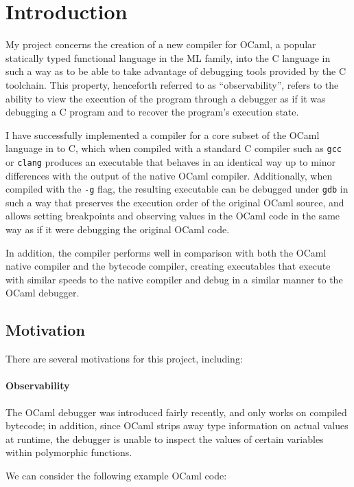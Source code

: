\chapter{Introduction}

My project concerns the creation of a new compiler for OCaml, a popular
statically typed functional language in the ML family, into the C language in
such a way as to be able to take advantage of debugging tools provided by the C
toolchain. This property, henceforth referred to as ``observability'', refers to
the ability to view the execution of the program through a debugger as if it was
debugging a C program and to recover the program's execution state.

I have successfully implemented a compiler for a core subset of the OCaml
language in to C, which when compiled with a standard C compiler such as
\texttt{gcc} or \texttt{clang} produces an executable that behaves in an
identical way up to minor differences with the output of the native OCaml
compiler. Additionally, when compiled with the \texttt{-g} flag, the resulting
executable can be debugged under \texttt{gdb} in such a way that preserves the
execution order of the original OCaml source, and allows setting breakpoints and
observing values in the OCaml code in the same way as if it were debugging the
original OCaml code.

In addition, the compiler performs well in comparison with both the OCaml native
compiler and the bytecode compiler, creating executables that execute with
similar speeds to the native compiler and debug in a similar manner to the OCaml
debugger.

\section{Motivation}

There are several motivations for this project, including:

\subsubsection{Observability}

The OCaml debugger was introduced fairly recently, and only works on compiled 
bytecode; in addition, since OCaml strips away type information on actual 
values at runtime, the debugger is unable to inspect the values of certain 
variables within polymorphic functions.

We can consider the following example OCaml code:

